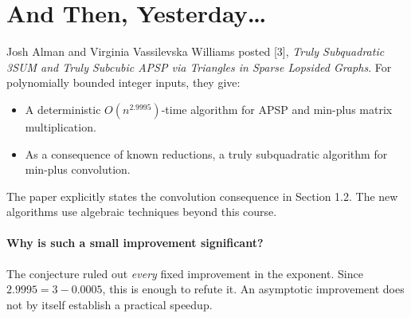 \documentclass[11  pt]{article}
\begin{document}
%
%

\newpage
\section{And Then, Yesterday\ldots}
\begin{center}
\end{center}

Josh Alman and Virginia Vassilevska Williams posted [3],
\emph{Truly Subquadratic 3SUM and Truly Subcubic APSP via Triangles in
Sparse Lopsided Graphs}.
For polynomially bounded integer inputs, they give:
\begin{itemize}
 \item A deterministic $O(n^{2.9995})$-time algorithm for APSP and
       min-plus matrix multiplication.
 \item As a consequence of known reductions, a truly subquadratic
       algorithm for min-plus convolution.
\end{itemize}
The paper explicitly states the convolution consequence in Section 1.2.
The new algorithms use algebraic techniques beyond this course.

\paragraph{Why is such a small improvement significant?}
The conjecture ruled out \emph{every} fixed improvement in the exponent.
Since $2.9995=3-0.0005$, this is enough to refute it.
An asymptotic improvement does not by itself establish a practical speedup.
\end{document}
